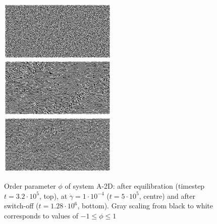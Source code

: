 \documentclass[8.5pt,twoside,twocolumn]{article}
\newcommand{\e}[1]{\cdot10^{#1}}
\begin{document}
\begin{figure}[htp]
\centering
\includegraphics[angle=0,width=0.5\textwidth]{phi_run703_320.jpg}\\
\includegraphics[angle=0,width=0.5\textwidth]{phi_run704_500.jpg}\\
\includegraphics[angle=0,width=0.5\textwidth]{phi_run705_1280.jpg}
\caption{Order parameter $\phi$ of system A-2D: after equilibration (timestep $t=3.2\e{5}$, top), at $\dot{\gamma}=1\cdot10^{-4}$ ($t=5\e{5}$, centre) and after switch-off ($t=1.28\e{6}$, bottom). Gray scaling from black to white corresponds to values of $-1\le\phi\le1$}
\label{fig1}
\end{figure}
\end{document}
